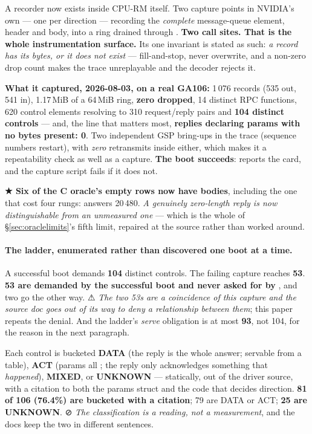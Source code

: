 \documentclass[10.5pt]{article}
\begin{document}
A recorder now exists inside CPU-RM itself. Two capture points in NVIDIA's own
 — one per direction — recording the \emph{complete} message-queue
element, header and body, into a  ring drained through . \textbf{Two
call sites. That is the whole instrumentation surface.} Its one invariant is stated as such:
\emph{a record has its bytes, or it does not exist} — fill-and-stop, never overwrite, and a
non-zero drop count makes the trace unreplayable and the decoder rejects it.

\textbf{What it captured, 2026-08-03, on a real GA106:} 1\,076 records (535 out, 541 in), 1.17\,MiB
of a 64\,MiB ring, \textbf{zero dropped}, 14 distinct RPC functions, 620 control elements
resolving to 310 request/reply pairs and \textbf{104 distinct controls} — and, the line that
matters most, \textbf{replies declaring params with no bytes present: 0}. Two independent GSP
bring-ups in the trace (sequence numbers restart), with \emph{zero} retransmits inside either,
which makes it a repeatability check as well as a capture. \textbf{The boot succeeds}:
 reports the card, and the capture script fails if it does not.

\textbf{★ Six of the C oracle's empty rows now have bodies}, including the one that cost four
rungs:  answers 20\,480. \emph{A genuinely zero-length reply is now
distinguishable from an unmeasured one} — which is the whole of \S\ref{sec:oraclelimits}'s fifth
limit, repaired at the source rather than worked around.

\paragraph{The ladder, enumerated rather than discovered one boot at a time.} A successful boot
demands \textbf{104} distinct controls. The failing  capture reaches \textbf{53}.
\textbf{53 are demanded by the successful boot and never asked for by }, and two go
the other way. ⚠ \emph{The two 53s are a coincidence of this capture and the source doc goes out
of its way to deny a relationship between them}; this paper repeats the denial. And the ladder's
\emph{serve} obligation is at most \textbf{93}, not 104, for the reason in the next paragraph.

Each control is bucketed \textbf{DATA} (the reply is the whole answer; servable from a table),
\textbf{ACT} (params all \code{[in]}; the reply only acknowledges something that \emph{happened}),
\textbf{MIXED}, or \textbf{UNKNOWN} — statically, out of the driver source, with a citation to
both the params struct and the code that decides direction. \textbf{81 of 106 (76.4\%) are
bucketed with a citation}; 79 are DATA or ACT; \textbf{25 are UNKNOWN}. ⊘ \emph{The
classification is a reading, not a measurement}, and the docs keep the two in different
sentences.
\end{document}
